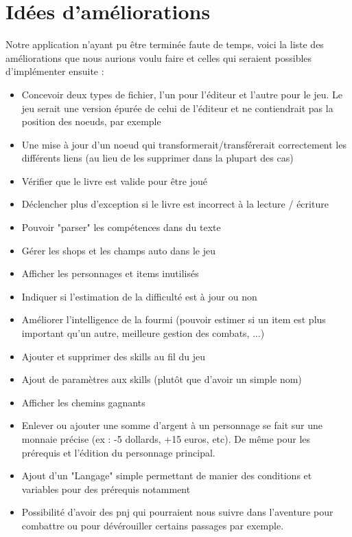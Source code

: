 	\section{Idées d'améliorations}

		Notre application n'ayant pu être terminée faute de temps, voici la liste des améliorations que nous aurions voulu faire et celles qui seraient possibles d'implémenter ensuite :

		\begin{itemize}
			\item{Concevoir deux types de fichier, l'un pour l'éditeur et l'autre pour le jeu. Le jeu serait une version épurée de celui de l'éditeur et ne contiendrait pas la position des noeuds, par exemple}
			\item{Une mise à jour d'un noeud qui transformerait/transférerait correctement les différents liens (au lieu de les supprimer dans la plupart des cas)}
			\item{Vérifier que le livre est valide pour être joué}
			\item{Déclencher plus d'exception si le livre est incorrect à la lecture / écriture}
			\item{Pouvoir "parser" les compétences dans du texte}
			\item{Gérer les shops et les champs auto dans le jeu}
			\item{Afficher les personnages et items inutilisés}
			\item{Indiquer si l'estimation de la difficulté est à jour ou non}
			\item{Améliorer l'intelligence de la fourmi (pouvoir estimer si un item est plus important qu'un autre, meilleure gestion des combats, ...)}
			\item{Ajouter et supprimer des skills au fil du jeu}
			\item{Ajout de paramètres aux skills (plutôt que d'avoir un simple nom)}
			\item{Afficher les chemins gagnants}
			\item{Enlever ou ajouter une somme d'argent à un personnage se fait sur une monnaie précise (ex : -5 dollards, +15 euros, etc). De même pour les prérequis et l'édition du personnage principal.}
			\item{Ajout d'un "Langage" simple permettant de manier des conditions et variables pour des prérequis notamment}
			\item{Possibilité d'avoir des pnj qui pourraient nous suivre dans l'aventure pour combattre ou pour dévérouiller certains passages par exemple.}
		\end{itemize}


